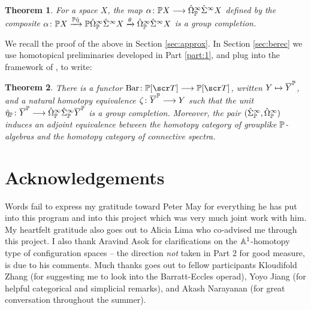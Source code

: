 \documentclass{amsart}
\newtheorem{thm}{Theorem}[section]
\theoremstyle{definition}
\begin{document}
\begin{thm}\label{thm:approxthmpalg}
For a space $X$, the map $\alpha \colon \mathbb{P} X \longrightarrow \hat{\Omega}^{\infty}_{\mathbb{P}} \hat{\Sigma}^{\infty} X$ defined by the composite $\alpha \colon \mathbb{P} X \xrightarrow{\mathbb{P} \hat{\eta}} \mathbb{P} \hat{\Omega}^{\infty}_{\mathbb{P}} \hat{\Sigma}^{\infty} X \xrightarrow{\theta} \hat{\Omega}^{\infty}_{\mathbb{P}} \hat{\Sigma}^{\infty} X$ is a group completion.
\end{thm}

\noindent We recall the proof of the above in Section \ref{sec:approx}.
In Section \ref{sec:berec} we use homotopical preliminaries developed in Part \ref{part:1}, and plug into the framework of \cite{kong2024group}, to write:

\begin{thm}\label{thm:BErecog}
There is a functor $\mathrm{Bar} \colon \bP[\sT] \rtarr \bP[\sT]$, written $Y \mapsto \overline{Y}^{\mathbb{P}}$, and a natural homotopy equivalence $\zeta \colon \overline{Y}^{\mathbb{P}} \longrightarrow Y$ such that the unit $\hat{\eta}_{\mathbb{P}} \colon \overline{Y}^{\mathbb{P}} \longrightarrow \hat{\Omega}^{\infty}_{\mathbb{P}} \hat{\Sigma}^{\infty}_{\mathbb{P}} \overline{Y}^{\mathbb{P}}$ is a group completion. Moreover, the pair $(\hat{\Sigma}^{\infty}_{\mathbb{P}}, \hat{\Omega}^{\infty}_{\mathbb{P}})$ induces an adjoint equivalence between the homotopy category of grouplike $\mathbb{P}$-algebras and the homotopy category of connective spectra.
\end{thm}


\section*{Acknowledgements}
Words fail to express my gratitude toward Peter May for everything he has put into this program and into this project which was very much joint work with him. My heartfelt gratitude also goes out to Alicia Lima who co-advised me through this project. I also thank Aravind Asok for  clarifications on the $\mathbb{A}^1$-homotopy type of configuration spaces -- the direction \emph{not} taken in Part 2 for good measure, is due to his comments. Much thanks goes out to fellow participants Kloudifold Zhang (for suggesting me to look into the Barratt-Eccles operad), Yoyo Jiang (for helpful categorical and simplicial remarks), and Akash Narayanan (for great conversation throughout the summer).
\end{document}
